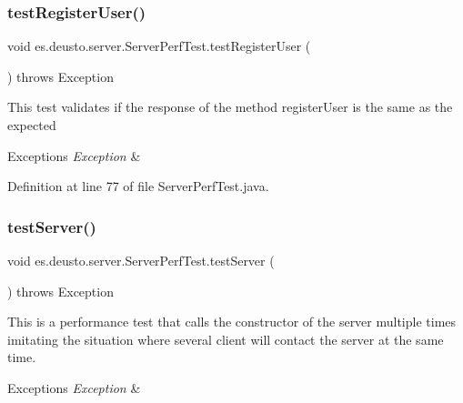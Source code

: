 \mbox{\label{classes_1_1deusto_1_1server_1_1_server_perf_test_acd84ae388a6b45b90f056d6c051908c6}} 
\subsubsection{\texorpdfstring{test\+Register\+User()}{testRegisterUser()}}
{\footnotesize\ttfamily void es.\+deusto.\+server.\+Server\+Perf\+Test.\+test\+Register\+User (\begin{DoxyParamCaption}{ }\end{DoxyParamCaption}) throws Exception}

This test validates if the response of the method register\+User is the same as the expected 
\begin{DoxyExceptions}{Exceptions}
{\em Exception} & \\
\hline
\end{DoxyExceptions}


Definition at line 77 of file Server\+Perf\+Test.\+java.

\mbox{\label{classes_1_1deusto_1_1server_1_1_server_perf_test_a5c187f8b48709153430bb3e21d392315}} 
\subsubsection{\texorpdfstring{test\+Server()}{testServer()}}
{\footnotesize\ttfamily void es.\+deusto.\+server.\+Server\+Perf\+Test.\+test\+Server (\begin{DoxyParamCaption}{ }\end{DoxyParamCaption}) throws Exception}

This is a performance test that calls the constructor of the server multiple times imitating the situation where several client will contact the server at the same time. 
\begin{DoxyExceptions}{Exceptions}
{\em Exception} & \\
\hline
\end{DoxyExceptions}


